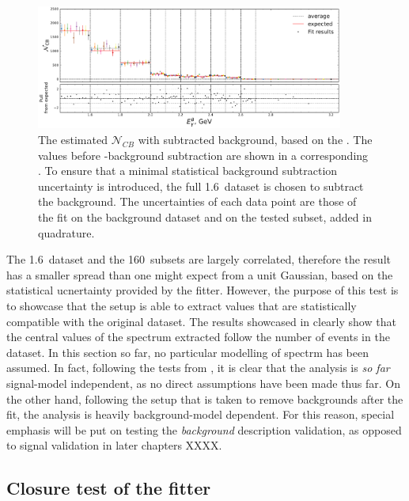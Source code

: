 \begin{figure}[htbp!]
    \includegraphics[width=0.9\textwidth]{figures/mc_validation/subtracted_signal_generic_mc.pdf}
    \caption{\label{fig:subtracted_validation_mc}
    The estimated $\mathcal{N}_{CB}$ with subtracted background, based on the .
    The values before \BB-background subtraction are shown in a corresponding .
    To ensure that a minimal statistical background subtraction uncertainty is introduced, the full 1.6~\invab dataset is chosen to subtract the background.
    The uncertainties of each data point are those of the \Mbc fit on the background dataset and on the tested subset, added in quadrature.
    }
\end{figure}

The 1.6~\invab dataset and the 160~\invfb subsets are largely correlated, therefore the result has a smaller spread than one might expect from a unit Gaussian, based on the statistical ucnertainty provided by the fitter.
However, the purpose of this test is to showcase that the setup is able to extract values that are statistically compatible with the original dataset.
The results showcased in  clearly show that the central values of the \EB spectrum extracted follow the number of \BtoXsgamma events in the dataset.
In this section so far, no particular modelling of \BtoXsgamma spectrm has been assumed.
In fact, following the tests from , it is clear that the analysis is \textit{so far} signal-model independent, as no direct assumptions have been made thus far.
On the other hand, following the setup that is taken to remove \BB backgrounds after the \Mbc fit, the analysis is heavily background-model dependent.
For this reason, special emphasis will be put on testing the \textit{background} description validation, as opposed to signal validation in later chapters XXXX.

\subsection{Closure test of the \texorpdfstring{\Mbc}{Mbc} fitter}\label{sec:closure_test}

